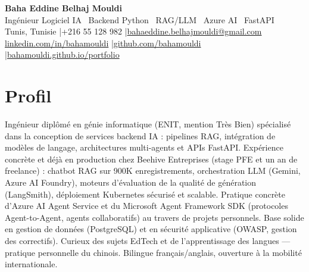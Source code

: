 \documentclass[a4paper,9pt]{article}
\begin{document}
\begin{center}
{\LARGE\bfseries\color{navy} Baha Eddine Belhaj Mouldi}\\[2pt]
{\normalsize\color{navy} Ingénieur Logiciel IA \textbar\ Backend Python \textbar\ RAG/LLM \textbar\ Azure AI \textbar\ FastAPI}\\[3pt]
{\small Tunis, Tunisie \quad|\quad +216 55 128 982 \quad|\quad \href{mailto:bahaeddine.belhajmouldi@gmail.com}{bahaeddine.belhajmouldi@gmail.com}}\\[1pt]
{\small \href{https://www.linkedin.com/in/bahamouldi}{linkedin.com/in/bahamouldi} \quad|\quad \href{https://github.com/bahamouldi}{github.com/bahamouldi} \quad|\quad \href{https://bahamouldi.github.io/portfolio/}{bahamouldi.github.io/portfolio}}
\end{center}
\vspace{1pt}
\section{Profil}
Ingénieur diplômé en génie informatique (ENIT, mention Très Bien) spécialisé dans la conception de services backend IA : pipelines RAG, intégration de modèles de langage, architectures multi-agents et APIs FastAPI. Expérience concrète et déjà en production chez Beehive Entreprises (stage PFE et un an de freelance) : chatbot RAG sur 900K enregistrements, orchestration LLM (Gemini, Azure AI Foundry), moteurs d'évaluation de la qualité de génération (LangSmith), déploiement Kubernetes sécurisé et scalable. Pratique concrète d'Azure AI Agent Service et du Microsoft Agent Framework SDK (protocoles Agent-to-Agent, agents collaboratifs) au travers de projets personnels. Base solide en gestion de données (PostgreSQL) et en sécurité applicative (OWASP, gestion des correctifs). Curieux des sujets EdTech et de l'apprentissage des langues --- pratique personnelle du chinois. Bilingue français/anglais, ouverture à la mobilité internationale.
\end{document}
